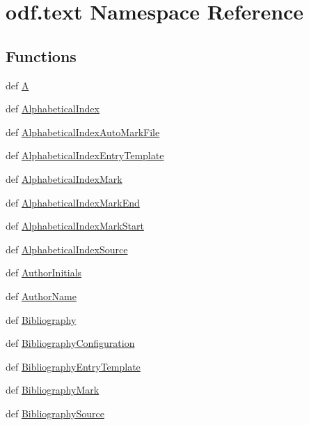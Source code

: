 \hypertarget{namespaceodf_1_1text}{\section{odf.\+text Namespace Reference}
\label{namespaceodf_1_1text}
}
\subsection*{Functions}
\begin{DoxyCompactItemize}
\item 
def \hyperlink{namespaceodf_1_1text_a2670515906134f7472ce45f1f1637b2c}{A}
\item 
def \hyperlink{namespaceodf_1_1text_a05156b8b98ca59be1884fbe393917aa8}{Alphabetical\+Index}
\item 
def \hyperlink{namespaceodf_1_1text_af05bfd3748ffe160d3b3d4d1d3cce881}{Alphabetical\+Index\+Auto\+Mark\+File}
\item 
def \hyperlink{namespaceodf_1_1text_a1ed3ff39507170502abaff1228c8a70b}{Alphabetical\+Index\+Entry\+Template}
\item 
def \hyperlink{namespaceodf_1_1text_a924e6728cd76fd0cdd24fcdd6baccf0d}{Alphabetical\+Index\+Mark}
\item 
def \hyperlink{namespaceodf_1_1text_a3fc871d486c85377de69ded3db8e652b}{Alphabetical\+Index\+Mark\+End}
\item 
def \hyperlink{namespaceodf_1_1text_af6c080f38e278d9d12c6082664a1542c}{Alphabetical\+Index\+Mark\+Start}
\item 
def \hyperlink{namespaceodf_1_1text_ae9a3ba757813825778ee38947b2cdcb9}{Alphabetical\+Index\+Source}
\item 
def \hyperlink{namespaceodf_1_1text_a8fd1b26ce99eb3b6bbbf0bb3e9ddbfce}{Author\+Initials}
\item 
def \hyperlink{namespaceodf_1_1text_a753114d384bf05db03bd2c4a349be1c9}{Author\+Name}
\item 
def \hyperlink{namespaceodf_1_1text_a7572d7c48deda54f777844c4f7da6a6d}{Bibliography}
\item 
def \hyperlink{namespaceodf_1_1text_ada953ad64f405049cdf9111048e76b6a}{Bibliography\+Configuration}
\item 
def \hyperlink{namespaceodf_1_1text_ab5663574afefd937a740415ebdac65b5}{Bibliography\+Entry\+Template}
\item 
def \hyperlink{namespaceodf_1_1text_a619bec2199db91191183a50c4cd74ca9}{Bibliography\+Mark}
\item 
def \hyperlink{namespaceodf_1_1text_a9a04d860c52d25dffce957e908d656cf}{Bibliography\+Source}

\end{DoxyCompactItemize}
